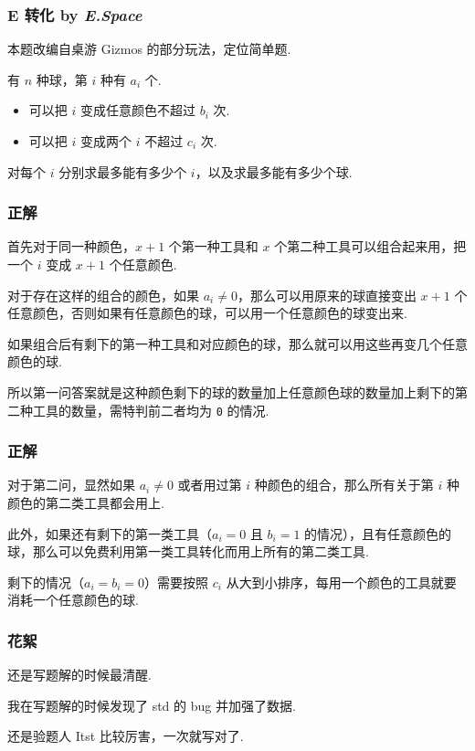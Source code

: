 \frame
{
 	\frametitle{E 转化 {by \itshape E.Space}}

	本题改编自桌游 Gizmos 的部分玩法，定位简单题.

	有 $n$ 种球，第 $i$ 种有 $a_i$ 个.
	\begin{itemize}
	\item 可以把 $i$ 变成任意颜色不超过 $b_i$ 次.
	\item 可以把 $i$ 变成两个 $i$ 不超过 $c_i$ 次.
	\end{itemize}

	对每个 $i$ 分别求最多能有多少个 $i$，以及求最多能有多少个球.

}
\frame
{
	\frametitle{正解}

	首先对于同一种颜色，$x+1$ 个第一种工具和 $x$ 个第二种工具可以组合起来用，把一个 $i$ 变成 $x+1$ 个任意颜色. \pause

	对于存在这样的组合的颜色，如果 $a_i\neq 0$，那么可以用原来的球直接变出 $x+1$ 个任意颜色，否则如果有任意颜色的球，可以用一个任意颜色的球变出来. \pause

	如果组合后有剩下的第一种工具和对应颜色的球，那么就可以用这些再变几个任意颜色的球. \pause

	所以第一问答案就是这种颜色剩下的球的数量加上任意颜色球的数量加上剩下的第二种工具的数量，需特判前二者均为 \texttt{0} 的情况.
}

\frame
{
	\frametitle{正解}

	对于第二问，显然如果 $a_i\neq 0$ 或者用过第 $i$ 种颜色的组合，那么所有关于第 $i$ 种颜色的第二类工具都会用上. \pause

	此外，如果还有剩下的第一类工具（$a_i=0$ 且 $b_i=1$ 的情况），且有任意颜色的球，那么可以免费利用第一类工具转化而用上所有的第二类工具. \pause

	剩下的情况（$a_i=b_i=0$）需要按照 $c_i$ 从大到小排序，每用一个颜色的工具就要消耗一个任意颜色的球.

}

\frame
{
	\frametitle{花絮}

	还是写题解的时候最清醒.

	我在写题解的时候发现了 std 的 bug 并加强了数据.

	还是验题人 Itst 比较厉害，一次就写对了.

}